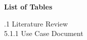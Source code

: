 \documentclass[12pt]{article}
\begin{document}
\setcounter{page}{4}   %


\begin{center}
    {\Large \bfseries List of Tables}
\end{center}

\vspace{1cm}

.1 \hspace{1em} Literature Review  \\[8pt]
5.1.1 \hspace{1em} Use Case Document  \\[8pt]
\end{document}
